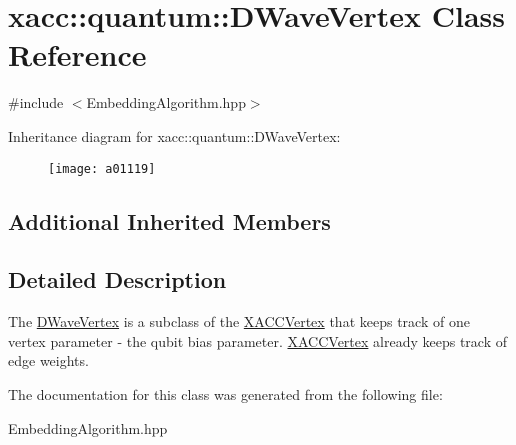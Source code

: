 \hypertarget{a01119}{}\section{xacc\+:\+:quantum\+:\+:D\+Wave\+Vertex Class Reference}
\label{a01119}


{\ttfamily \#include $<$Embedding\+Algorithm.\+hpp$>$}

Inheritance diagram for xacc\+:\+:quantum\+:\+:D\+Wave\+Vertex\+:\begin{figure}[H]
\begin{center}
\leavevmode
\texttt{[image: a01119]}
\end{center}
\end{figure}
\subsection*{Additional Inherited Members}


\subsection{Detailed Description}
The \hyperlink{a01119}{D\+Wave\+Vertex} is a subclass of the \hyperlink{a01523}{X\+A\+C\+C\+Vertex} that keeps track of one vertex parameter -\/ the qubit bias parameter. \hyperlink{a01523}{X\+A\+C\+C\+Vertex} already keeps track of edge weights. 

The documentation for this class was generated from the following file\+:\begin{DoxyCompactItemize}
\item 
Embedding\+Algorithm.\+hpp\end{DoxyCompactItemize}

